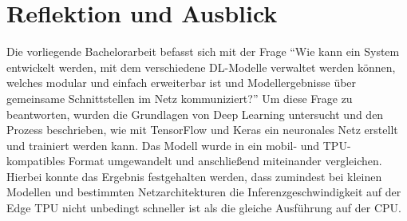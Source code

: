 \chapter{Reflektion und Ausblick}
Die vorliegende Bachelorarbeit befasst sich mit der Frage
\enquote{Wie kann ein System entwickelt werden, mit dem verschiedene DL-Modelle
verwaltet werden können, welches modular und einfach erweiterbar ist
und Modellergebnisse über gemeinsame Schnittstellen im Netz kommuniziert?}
Um diese Frage zu beantworten, wurden
die Grundlagen von Deep Learning untersucht
und den Prozess beschrieben, wie mit TensorFlow und Keras
ein neuronales Netz erstellt und trainiert werden kann.
Das Modell wurde in ein mobil- und TPU-kompatibles Format umgewandelt
und anschließend miteinander vergleichen.
Hierbei konnte das Ergebnis festgehalten werden,
dass zumindest bei kleinen Modellen und bestimmten Netzarchitekturen
die Inferenzgeschwindigkeit
auf der Edge TPU nicht unbedingt schneller ist als die gleiche Ausführung auf der CPU.